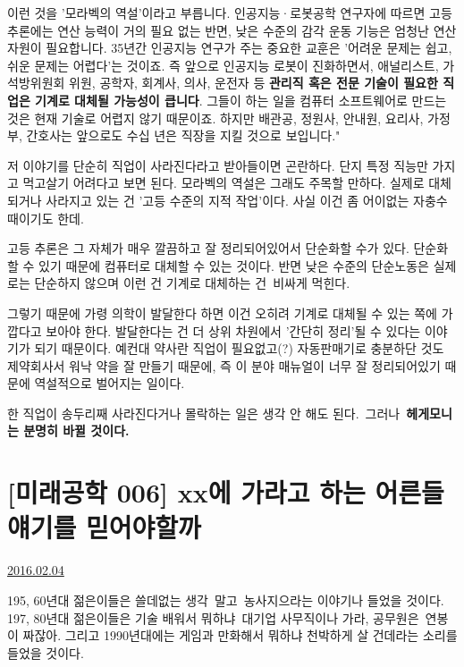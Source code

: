 이런 것을 '모라벡의 역설'이라고 부릅니다. 인공지능·로봇공학 연구자에 따르면 고등 추론에는 연산 능력이 거의 필요 없는 반면, 낮은 수준의 감각 운동 기능은 엄청난 연산 자원이 필요합니다. 35년간 인공지능 연구가 주는 중요한 교훈은 '어려운 문제는 쉽고, 쉬운 문제는 어렵다'는 것이죠. 즉 앞으로 인공지능 로봇이 진화하면서, 애널리스트, 가석방위원회 위원, 공학자, 회계사, 의사, 운전자 등 \textbf{관리직 혹은 전문 기술이 필요한 직업은 기계로 대체될 가능성이 큽니다}. 그들이 하는 일을 컴퓨터 소프트웨어로 만드는 것은 현재 기술로 어렵지 않기 때문이죠. 하지만 배관공, 정원사, 안내원, 요리사, 가정부, 간호사는 앞으로도 수십 년은 직장을 지킬 것으로 보입니다."
\vspace{5mm}

저 이야기를 단순히 직업이 사라진다라고 받아들이면 곤란하다.
단지 특정 직능만 가지고 먹고살기 어려다고 보면 된다.
모라벡의 역설은 그래도 주목할 만하다.
실제로 대체되거나 사라지고 있는 건 '고등 수준의 지적 작업'이다.
사실 이건 좀 어이없는 자충수 때이기도 한데.
\vspace{5mm}

고등 추론은 그 자체가 매우 깔끔하고 잘 정리되어있어서 단순화할 수가 있다.
단순화할 수 있기 때문에 컴퓨터로 대체할 수 있는 것이다.
반면 낮은 수준의 단순노동은 실제로는 단순하지 않으며 이런 건 기계로 대체하는 건 비싸게 먹힌다.
\vspace{5mm}

그렇기 때문에 가령 의학이 발달한다 하면 이건 오히려 기계로 대체될 수 있는 쪽에 가깝다고 보아야 한다.
발달한다는 건 더 상위 차원에서 '간단히 정리'될 수 있다는 이야기가 되기 때문이다.
예컨대 약사란 직업이 필요없고(?) 자동판매기로 충분하단 것도
제약회사서 워낙 약을 잘 만들기 때문에, 즉 이 분야 매뉴얼이 너무 잘 정리되어있기 때문에 역설적으로 벌어지는 일이다.
\vspace{5mm}

한 직업이 송두리째 사라진다거나 몰락하는 일은 생각 안 해도 된다. 그러나 \textbf{헤게모니는 분명히 바뀔 것이다.}
\vspace{5mm}






\section{[미래공학 006] xx에 가라고 하는 어른들 얘기를 믿어야할까}
\href{https://www.kockoc.com/Apoc/623414}{2016.02.04}

\vspace{5mm}

195, 60년대 젊은이들은 쓸데없는 생각 말고 농사지으라는 이야기나 들었을 것이다.
197, 80년대 젊은이들은 기술 배워서 뭐하냐 대기업 사무직이나 가라, 공무원은 연봉이 짜잖아.
그리고 1990년대에는 게임과 만화해서 뭐하냐 천박하게 살 건데라는 소리를 들었을 것이다.
\vspace{5mm}

